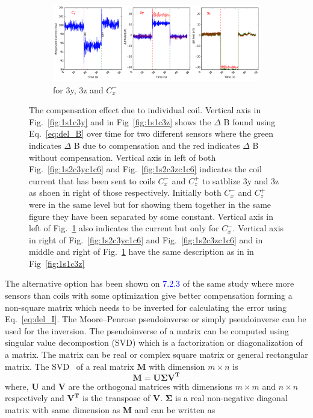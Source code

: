 \begin{figure}[!htb]
\begin{subfigure}{.5\linewidth}
    \end{subfigure}\\[1ex]
    \begin{subfigure}{1\linewidth}
        \centering
        \includegraphics[width=\linewidth, height= 3 cm]{Images/2s1c3y3zc1}
        \caption{for 3y, 3z and $C_x^-$ }
        \label{fig:2s1c3y3zc1}
    \end{subfigure}

    \caption{The compensation effect due to individual coil. Vertical axis in Fig.~\ref{fig:1s1c3y} and in Fig~\ref{fig:1s1c3z} shows the $\Delta$ B found using Eq.~\ref{eq:del_B} over time for two different sensors where the green indicates $\Delta$ B due to compensation and the red indicates $\Delta$ B without compensation. Vertical axis in left of both Fig.~\ref{fig:1s2c3yc1c6} and  Fig.~\ref{fig:1s2c3zc1c6} indicates the coil current that has been sent to coils $C_x^-$ and $C_z^+$ to satblize 3y and 3z as shoen in right of those respectively. Initially both $C_x^-$ and $C_z^+$ were in the same level but for showing them together in the same figure they have been separated by some constant.  Vertical axis in left of Fig.~\ref{fig:2s1c3y3zc1} also indicates the current but only for $C_x^-$. Vertical axis in right of Fig.~\ref{fig:1s2c3yc1c6} and  Fig.~\ref{fig:1s2c3zc1c6} and in middle and right of Fig.~\ref{fig:2s1c3y3zc1} have the same description as in in Fig~\ref{fig:1s1c3z} }
    \label{fig:1d}
\end{figure}

\FloatBarrier
The alternative option has been shown on \textcolor{blue}{7.2.3} of the same study where more sensors than coils with some optimization give better compensation forming a non-square matrix which needs to be inverted for calculating the error using Eq.~\ref{eq:del_I}. The Moore--Penrose pseudoinverse \cite{pseudo} or simply pseudoinverse can be used for the inversion. The pseudoinverse of a matrix can be computed using singular value decompostion (SVD) which is a factorization or diagonalization of a matrix. The matrix can be real or complex square matrix or general rectangular matrix. The SVD~\cite{svd2,svd3} of a real matrix $\bm{M}$ with dimension $m \times n$ is 
\begin{equation}\label{eq:m}
        \bm{M} = \bm{U} \bm{\Sigma} \bm{V^T}
\end{equation}
where, $\bm{U}$ and $\bm{V}$ are the orthogonal matrices with dimensions $m \times m$ and $n \times n$ respectively and $\bm{V^T}$ is the transpose of $\bm{V}$. $\bm{\Sigma}$ is a real non-negative diagonal matrix with same dimension as  $\bm{M}$ and can be written as

